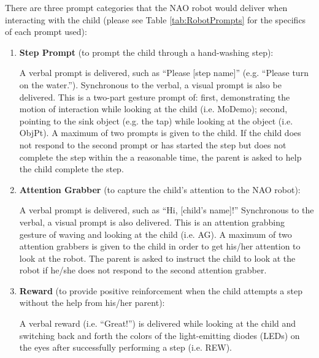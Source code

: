There are three prompt categories that the NAO robot would deliver when interacting with the child (please see Table \ref{tab:RobotPrompts} for the specifics of each prompt used):
\begin{enumerate}
	\item \textbf{Step Prompt} (to prompt the child through a hand-washing step):
	
	A verbal prompt is delivered, such as “Please [step name]” (e.g. “Please turn on the water.”).  Synchronous to the verbal, a visual prompt is also be delivered. This is a two-part gesture prompt of: first, demonstrating the motion of interaction while looking at the child (i.e. MoDemo); second, pointing to the sink object (e.g. the tap) while looking at the object (i.e. ObjPt). A maximum of two prompts is given to the child. If the child does not respond to the second prompt or has started the step but does not complete the step within the a reasonable time, the parent is asked to help the child complete the step. 
	
	\item \textbf{Attention Grabber} (to capture the child's attention to the NAO robot): 
	
	A verbal prompt is delivered, such as “Hi, [child's name]!”  Synchronous to the verbal, a visual prompt is also delivered. This is an attention grabbing gesture of waving and looking at the child (i.e. AG). A maximum of two attention grabbers is given to the child in order to get his/her attention to look at the robot.  The parent is asked to instruct the child to look at the robot if he/she does not respond to the second attention grabber. 
	
	\item \textbf{Reward} (to provide positive reinforcement when the child attempts a step without the help from his/her parent): 
	
	A verbal reward (i.e. “Great!”) is delivered while looking at the child and switching back and forth the colors of the light-emitting diodes (LEDs) on the eyes after successfully performing a step (i.e. REW).
\end{enumerate}
